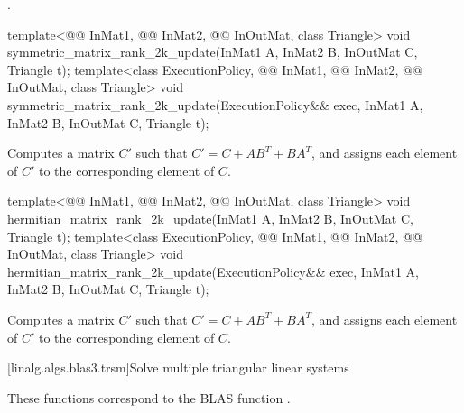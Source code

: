 \pnum
\complexity
{}.

\begin{itemdecl}
template<@@ InMat1, @@ InMat2,
         @@ InOutMat, class Triangle>
  void symmetric_matrix_rank_2k_update(InMat1 A, InMat2 B, InOutMat C, Triangle t);
template<class ExecutionPolicy, @@ InMat1, @@ InMat2,
         @@ InOutMat, class Triangle>
  void symmetric_matrix_rank_2k_update(ExecutionPolicy&& exec,
                                       InMat1 A, InMat2 B, InOutMat C, Triangle t);
\end{itemdecl}

\begin{itemdescr}
\pnum
\effects
Computes a matrix $C'$ such that $C' = C + A B^T + B A^T$,
and assigns each element of $C'$ to the corresponding element of $C$.
\end{itemdescr}

\begin{itemdecl}
template<@@ InMat1, @@ InMat2,
         @@ InOutMat, class Triangle>
  void hermitian_matrix_rank_2k_update(InMat1 A, InMat2 B, InOutMat C, Triangle t);
template<class ExecutionPolicy,
         @@ InMat1, @@ InMat2,
         @@ InOutMat, class Triangle>
  void hermitian_matrix_rank_2k_update(ExecutionPolicy&& exec,
                                       InMat1 A, InMat2 B, InOutMat C, Triangle t);
\end{itemdecl}

\begin{itemdescr}
\pnum
\effects
Computes a matrix $C'$ such that $C' = C + A B^T + B A^T$,
and assigns each element of $C'$ to the corresponding element of $C$.
\end{itemdescr}

[linalg.algs.blas3.trsm]{Solve multiple triangular linear systems}

\pnum
\begin{note}
These functions correspond to the BLAS function .
\end{note}

